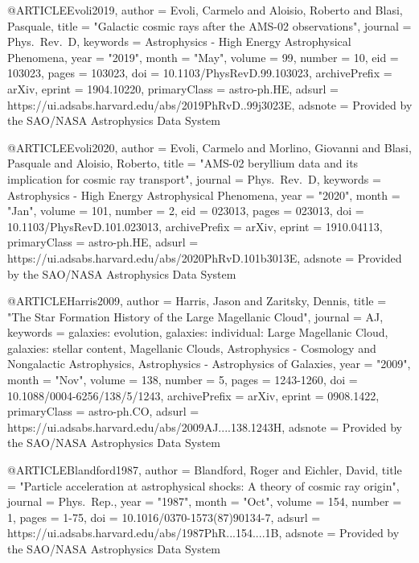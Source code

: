 \documentclass[useAMS,usenatbib]{mnras}
\def\aj{AJ}\def\actaa{Acta Astron.}\def\araa{ARA\&A}\def\apj{ApJ}\def\apjl{ApJ}\def\apjs{ApJS}\def\ao{Appl.~Opt.}\def\apss{Ap\&SS}\def\aap{A\&A}\def\aapr{A\&A~Rev.}\def\aaps{A\&AS}\def\azh{AZh}\def\baas{BAAS}\def\bac{Bull. astr. Inst. Czechosl.}\def\caa{Chinese Astron. Astrophys.}\def\cjaa{Chinese J. Astron. Astrophys.}\def\icarus{Icarus}\def\jcap{J. Cosmology Astropart. Phys.}\def\jrasc{JRASC}\def\mnras{MNRAS}\def\memras{MmRAS}\def\na{New A}\def\nar{New A Rev.}\def\pasa{PASA}\def\pra{Phys.~Rev.~A}\def\prb{Phys.~Rev.~B}\def\prc{Phys.~Rev.~C}\def\prd{Phys.~Rev.~D}\def\pre{Phys.~Rev.~E}\def\prl{Phys.~Rev.~Lett.}\def\pasp{PASP}\def\pasj{PASJ}\def\qjras{QJRAS}\def\rmxaa{Rev. Mexicana Astron. Astrofis.}\def\skytel{S\&T}\def\solphys{Sol.~Phys.}\def\sovast{Soviet~Ast.}\def\ssr{Space~Sci.~Rev.}\def\zap{ZAp}\def\nat{Nature}\def\iaucirc{IAU~Circ.}\def\aplett{Astrophys.~Lett.}\def\apspr{Astrophys.~Space~Phys.~Res.}\def\bain{Bull.~Astron.~Inst.~Netherlands}\def\fcp{Fund.~Cosmic~Phys.}\def\gca{Geochim.~Cosmochim.~Acta}\def\grl{Geophys.~Res.~Lett.}\def\jcp{J.~Chem.~Phys.}\def\jgr{J.~Geophys.~Res.}\def\jqsrt{J.~Quant.~Spec.~Radiat.~Transf.}\def\memsai{Mem.~Soc.~Astron.~Italiana}\def\nphysa{Nucl.~Phys.~A}\def\physrep{Phys.~Rep.}\def\physscr{Phys.~Scr}\def\planss{Planet.~Space~Sci.}\def\procspie{Proc.~SPIE}
\begin{document}
@ARTICLE{Evoli2019,
       author = {{Evoli}, Carmelo and {Aloisio}, Roberto and {Blasi}, Pasquale},
        title = "{Galactic cosmic rays after the AMS-02 observations}",
      journal = {\prd},
     keywords = {Astrophysics - High Energy Astrophysical Phenomena},
         year = "2019",
        month = "May",
       volume = {99},
       number = {10},
          eid = {103023},
        pages = {103023},
          doi = {10.1103/PhysRevD.99.103023},
archivePrefix = {arXiv},
       eprint = {1904.10220},
 primaryClass = {astro-ph.HE},
       adsurl = {https://ui.adsabs.harvard.edu/abs/2019PhRvD..99j3023E},
      adsnote = {Provided by the SAO/NASA Astrophysics Data System}
}

@ARTICLE{Evoli2020,
       author = {{Evoli}, Carmelo and {Morlino}, Giovanni and {Blasi}, Pasquale and
         {Aloisio}, Roberto},
        title = "{AMS-02 beryllium data and its implication for cosmic ray transport}",
      journal = {\prd},
     keywords = {Astrophysics - High Energy Astrophysical Phenomena},
         year = "2020",
        month = "Jan",
       volume = {101},
       number = {2},
          eid = {023013},
        pages = {023013},
          doi = {10.1103/PhysRevD.101.023013},
archivePrefix = {arXiv},
       eprint = {1910.04113},
 primaryClass = {astro-ph.HE},
       adsurl = {https://ui.adsabs.harvard.edu/abs/2020PhRvD.101b3013E},
      adsnote = {Provided by the SAO/NASA Astrophysics Data System}
}

@ARTICLE{Harris2009,
       author = {{Harris}, Jason and {Zaritsky}, Dennis},
        title = "{The Star Formation History of the Large Magellanic Cloud}",
      journal = {\aj},
     keywords = {galaxies: evolution, galaxies: individual: Large Magellanic Cloud, galaxies: stellar content, Magellanic Clouds, Astrophysics - Cosmology and Nongalactic Astrophysics, Astrophysics - Astrophysics of Galaxies},
         year = "2009",
        month = "Nov",
       volume = {138},
       number = {5},
        pages = {1243-1260},
          doi = {10.1088/0004-6256/138/5/1243},
archivePrefix = {arXiv},
       eprint = {0908.1422},
 primaryClass = {astro-ph.CO},
       adsurl = {https://ui.adsabs.harvard.edu/abs/2009AJ....138.1243H},
      adsnote = {Provided by the SAO/NASA Astrophysics Data System}
}


@ARTICLE{Blandford1987,
       author = {{Blandford}, Roger and {Eichler}, David},
        title = "{Particle acceleration at astrophysical shocks: A theory of cosmic ray origin}",
      journal = {\physrep},
         year = "1987",
        month = "Oct",
       volume = {154},
       number = {1},
        pages = {1-75},
          doi = {10.1016/0370-1573(87)90134-7},
       adsurl = {https://ui.adsabs.harvard.edu/abs/1987PhR...154....1B},
      adsnote = {Provided by the SAO/NASA Astrophysics Data System}
}
\end{document}
